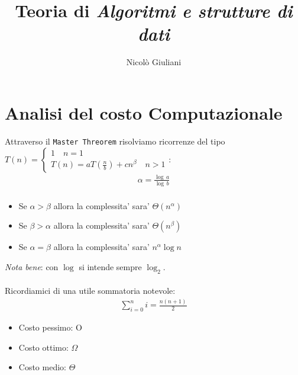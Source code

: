 \documentclass[10pt]{extarticle}
\title{Teoria di \textit{Algoritmi e strutture di dati}}
\author{Nicolò Giuliani}
\date{}
\begin{document}
\maketitle
\section*{Analisi del costo Computazionale}
Attraverso il \texttt{Master Threorem} risolviamo ricorrenze del tipo $T(n)=\begin{cases}
  1 \quad n=1 \\
  T(n)=aT(\frac{n}{b})+cn^\beta \quad n>1
\end{cases}$:
\begin{align*}
  \alpha=\frac{\log \,a}{\log \,b} \\
\end{align*}
\begin{itemize}
  \item Se $\alpha > \beta $ allora la complessita' sara' $\Theta(n^\alpha)$
  \item Se $\beta > \alpha $ allora la complessita' sara' $\Theta(n^\beta)$
  \item Se $\alpha = \beta$ allora la complessita' sara' $n^\alpha \log n$
\end{itemize}
\textit{Nota bene}: con $\log$ si intende sempre $\log_2$. \\
\vspace{5px}\\
Ricordiamici di una utile sommatoria notevole:
\begin{align*}
  \sum_{i=0}^n i= \frac{n(n+1)}{2}
\end{align*}
\begin{itemize}
  \item Costo pessimo: O
  \item Costo ottimo: $\Omega$
  \item Costo medio: $\Theta$
\end{itemize}
\end{document}
